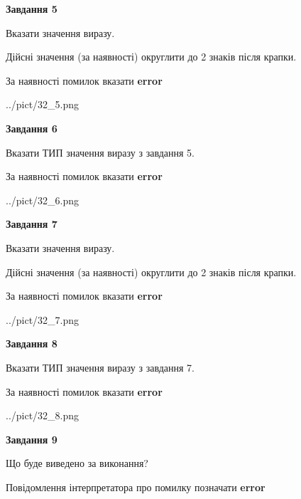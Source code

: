\documentclass[11pt, ukrainian]{article}
\begin{document}
{\begin {large}
{\begin {center}\textbf{Завдання 5}\end {center}}\par
Вказати значення виразу. \par
Дійсні значення (за наявності) округлити до 2 знаків після крапки. \par
За наявності помилок вказати \textbf{error}

\begin{center}
	{../pict/32_5.png}
\end{center}
\newpage

{\begin {center}\textbf{Завдання 6}\end {center}}\par
Вказати ТИП значення виразу з завдання 5. \par
За наявності помилок вказати \textbf{error}

\begin{center}
	{../pict/32_6.png}
\end{center}
\newpage

{\begin {center}\textbf{Завдання 7}\end {center}}\par
Вказати значення виразу. \par
Дійсні значення (за наявності) округлити до 2 знаків після крапки. \par
За наявності помилок вказати \textbf{error}

\begin{center}
	{../pict/32_7.png}
\end{center}
\newpage

{\begin {center}\textbf{Завдання 8}\end {center}}\par
Вказати ТИП значення виразу з завдання 7. \par
За наявності помилок вказати \textbf{error}

\begin{center}
	{../pict/32_8.png}
\end{center}
\newpage

{\begin {center}\textbf{Завдання 9}\end {center}}\par
Що буде виведено за виконання? \par
Повідомлення інтерпретатора про помилку позначати \textbf{error}


\end{large}}
\end{document}
